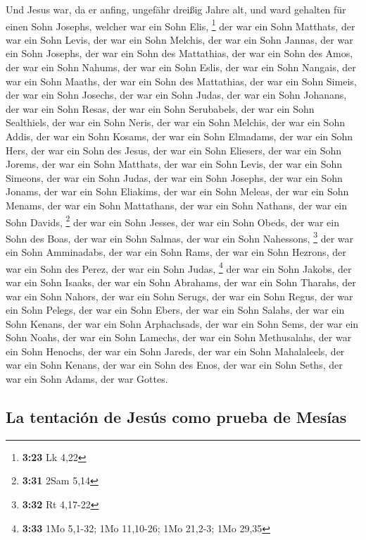  Und Jesus war, da er anfing, ungefähr dreißig Jahre alt,
und ward gehalten für einen Sohn Josephs, welcher war ein Sohn Elis,
\footnote{\textbf{3:23} Lk 4,22}  der war ein Sohn
Matthats, der war ein Sohn Levis, der war ein Sohn Melchis, der war ein
Sohn Jannas, der war ein Sohn Josephs,  der war ein Sohn
des Mattathias, der war ein Sohn des Amos, der war ein Sohn Nahums, der
war ein Sohn Eslis, der war ein Sohn Nangais,  der war
ein Sohn Maaths, der war ein Sohn des Mattathias, der war ein Sohn
Simeis, der war ein Sohn Josechs, der war ein Sohn Judas,
 der war ein Sohn Johanans, der war ein Sohn Resas, der
war ein Sohn Serubabels, der war ein Sohn Sealthiels, der war ein Sohn
Neris,  der war ein Sohn Melchis, der war ein Sohn Addis,
der war ein Sohn Kosams, der war ein Sohn Elmadams, der war ein Sohn
Hers,  der war ein Sohn des Jesus, der war ein Sohn
Eliesers, der war ein Sohn Jorems, der war ein Sohn Matthats, der war
ein Sohn Levis,  der war ein Sohn Simeons, der war ein
Sohn Judas, der war ein Sohn Josephs, der war ein Sohn Jonams, der war
ein Sohn Eliakims,  der war ein Sohn Meleas, der war ein
Sohn Menams, der war ein Sohn Mattathans, der war ein Sohn Nathans, der
war ein Sohn Davids, \footnote{\textbf{3:31} 2Sam 5,14} 
der war ein Sohn Jesses, der war ein Sohn Obeds, der war ein Sohn des
Boas, der war ein Sohn Salmas, der war ein Sohn Nahessons, \footnote{\textbf{3:32}
  Rt 4,17-22}  der war ein Sohn Amminadabs, der war ein
Sohn Rams, der war ein Sohn Hezrons, der war ein Sohn des Perez, der war
ein Sohn Judas, \footnote{\textbf{3:33} 1Mo 5,1-32; 1Mo 11,10-26; 1Mo
  21,2-3; 1Mo 29,35}  der war ein Sohn Jakobs, der war
ein Sohn Isaaks, der war ein Sohn Abrahams, der war ein Sohn Tharahs,
der war ein Sohn Nahors,  der war ein Sohn Serugs, der
war ein Sohn Regus, der war ein Sohn Pelegs, der war ein Sohn Ebers, der
war ein Sohn Salahs,  der war ein Sohn Kenans, der war
ein Sohn Arphachsads, der war ein Sohn Sems, der war ein Sohn Noahs, der
war ein Sohn Lamechs,  der war ein Sohn Methusalahs, der
war ein Sohn Henochs, der war ein Sohn Jareds, der war ein Sohn
Mahalaleels, der war ein Sohn Kenans,  der war ein Sohn
des Enos, der war ein Sohn Seths, der war ein Sohn Adams, der war
Gottes.

\hypertarget{la-tentaciuxf3n-de-jesuxfas-como-prueba-de-mesuxedas}{%
\subsection{La tentación de Jesús como prueba de
Mesías}\label{la-tentaciuxf3n-de-jesuxfas-como-prueba-de-mesuxedas}}

